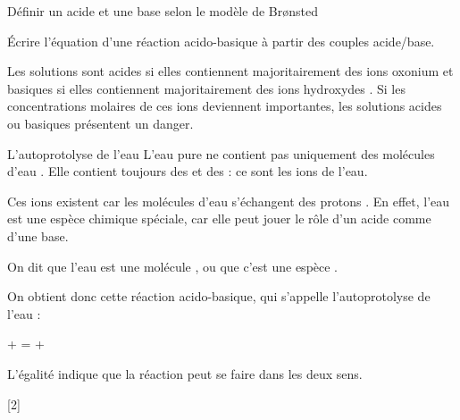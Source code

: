 \tetePremStssChim
\vspace*{-30pt}

\begin{objectifs}
  \item Définir un acide et une base selon le modèle de Br\o{}nsted
  \item Écrire l'équation d'une réaction acido-basique à partir des couples acide/base.
\end{objectifs}

\begin{contexte}
  Les solutions sont acides si elles contiennent majoritairement des ions oxonium \oxonium
  et basiques si elles contiennent majoritairement des ions hydroxydes \hydroxyde.
  Si les concentrations molaires de ces ions deviennent importantes, les solutions acides ou basiques présentent un danger.

\end{contexte}

\begin{doc}{L'autoprotolyse de l'eau}
  L'eau pure ne contient pas uniquement des molécules d'eau \eau.
  Elle contient toujours des  \oxonium et des  \hydroxyde : ce sont les ions de l'eau.

  Ces ions existent car les molécules d'eau \eau s'échangent des protons \ionHydrogene.
  En effet, l'eau est une espèce chimique spéciale, car elle peut jouer le rôle d'un acide comme d'une base.
  \begin{importants}  
    On dit que l'eau est une molécule , ou que c'est une espèce .
  \end{importants}

  On obtient donc cette réaction acido-basique, qui s’appelle l’autoprotolyse de l’eau : 
  \begin{center}
    \eau +  = \oxonium + \hydroxyde
  \end{center}
  \attention L'égalité indique que la réaction peut se faire dans les deux sens.
\end{doc}


[2]


